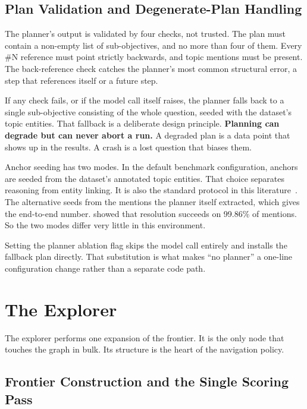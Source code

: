 \subsection{Plan Validation and Degenerate-Plan Handling}

The planner's output is validated by four checks, not trusted. The plan must
contain a non-empty list of sub-objectives, and no more than four of them. Every
\textsf{\#N} reference must point strictly backwards, and topic mentions must be
present. The back-reference check catches the planner's most common structural
error, a step that references itself or a future step.

If any check fails, or if the model call itself raises, the planner falls back
to a single sub-objective consisting of the whole question, seeded with the
dataset's topic entities. That fallback is a deliberate design principle.
\textbf{Planning can degrade but can never abort a run.} A degraded plan is a
data point that shows up in the results. A crash is a lost question that biases
them.

Anchor seeding has two modes. In the default benchmark configuration, anchors
are seeded from the dataset's annotated topic entities. That choice separates
reasoning from entity linking. It is also the standard protocol in this
literature~\cite{sun2024think,luo2024reasoning}. The alternative seeds from the
mentions the planner itself extracted, which gives the end-to-end number.
 showed that resolution succeeds on 99.86\% of
mentions. So the two modes differ very little in this environment.

Setting the planner ablation flag skips the model call entirely and installs the
fallback plan directly. That substitution is what makes ``no planner'' a
one-line configuration change rather than a separate code path.

\section{The Explorer}\label{sec:explorer}

The explorer performs one expansion of the
frontier. It is the only node that touches the graph in bulk.
Its structure is the heart of the navigation policy.

\subsection{Frontier Construction and the Single Scoring Pass}


